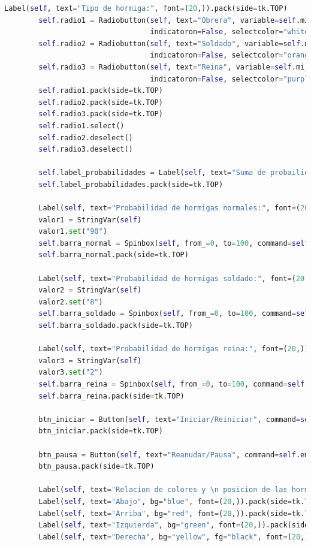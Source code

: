 \begin{lstlisting}[language=Python]
        Label(self, text="Tipo de hormiga:", font=(20,)).pack(side=tk.TOP)
        self.radio1 = Radiobutton(self, text="Obrera", variable=self.mi_var, value=1, command=self.seleccion,
                                  indicatoron=False, selectcolor="white", font=(20,), fg="black")
        self.radio2 = Radiobutton(self, text="Soldado", variable=self.mi_var, value=2, command=self.seleccion,
                                  indicatoron=False, selectcolor="orange", font=(20,), fg="black")
        self.radio3 = Radiobutton(self, text="Reina", variable=self.mi_var, value=3, command=self.seleccion,
                                  indicatoron=False, selectcolor="purple", font=(20,), fg="black")
        self.radio1.pack(side=tk.TOP)
        self.radio2.pack(side=tk.TOP)
        self.radio3.pack(side=tk.TOP)
        self.radio1.select()
        self.radio2.deselect()
        self.radio3.deselect()

        self.label_probabilidades = Label(self, text="Suma de probailidades: 100%", font=(20,))
        self.label_probabilidades.pack(side=tk.TOP)

        Label(self, text="Probabilidad de hormigas normales:", font=(20,)).pack(side=tk.TOP)
        valor1 = StringVar(self)
        valor1.set("90")
        self.barra_normal = Spinbox(self, from_=0, to=100, command=self.mover_spinner, textvariable=valor1)
        self.barra_normal.pack(side=tk.TOP)

        Label(self, text="Probabilidad de hormigas soldado:", font=(20,)).pack(side=tk.TOP)
        valor2 = StringVar(self)
        valor2.set("8")
        self.barra_soldado = Spinbox(self, from_=0, to=100, command=self.mover_spinner, textvariable=valor2)
        self.barra_soldado.pack(side=tk.TOP)

        Label(self, text="Probabilidad de hormigas reina:", font=(20,)).pack(side=tk.TOP)
        valor3 = StringVar(self)
        valor3.set("2")
        self.barra_reina = Spinbox(self, from_=0, to=100, command=self.mover_spinner, textvariable=valor3)
        self.barra_reina.pack(side=tk.TOP)

        btn_iniciar = Button(self, text="Iniciar/Reiniciar", command=self.iniciar, font=(20,))
        btn_iniciar.pack(side=tk.TOP)

        btn_pausa = Button(self, text="Reanudar/Pausa", command=self.empezar_detener, font=(20,))
        btn_pausa.pack(side=tk.TOP)

        Label(self, text="Relacion de colores y \n posicion de las hormiga:", font=(20,)).pack(side=tk.TOP)
        Label(self, text="Abajo", bg="blue", font=(20,)).pack(side=tk.TOP)
        Label(self, text="Arriba", bg="red", font=(20,)).pack(side=tk.TOP)
        Label(self, text="Izquierda", bg="green", font=(20,)).pack(side=tk.TOP)
        Label(self, text="Derecha", bg="yellow", fg="black", font=(20,)).pack(side=tk.TOP)


\end{lstlisting}
